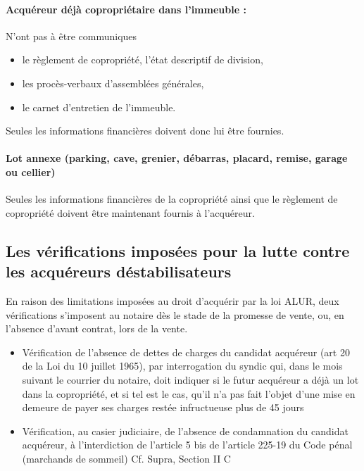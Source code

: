 			\paragraph{Acquéreur déjà copropriétaire dans l'immeuble :}
			N’ont pas à être communiques
			\begin{itemize}
				\item  le règlement de copropriété, l'état descriptif de division,
				\item  les procès-verbaux d'assemblées générales,
				\item  le carnet d'entretien de l'immeuble.
			\end{itemize}
			Seules les informations financières doivent donc lui être fournies.
			
			\paragraph{Lot annexe (parking, cave, grenier, débarras, placard, remise, garage ou cellier)}
			Seules les informations financières de la copropriété ainsi que le règlement de copropriété doivent être
			maintenant fournis à l'acquéreur.
		
	\subsection{Les vérifications imposées pour la lutte contre les acquéreurs déstabilisateurs}
		
		En raison des limitations imposées au droit d’acquérir par la loi ALUR, deux vérifications s’imposent au
		notaire dès le stade de la promesse de vente, ou, en l’absence d’avant contrat, lors de la vente.
		\begin{itemize}
			\item Vérification de l’absence de dettes de charges du candidat acquéreur (art 20 \II{} de la Loi du 10
			juillet 1965), par interrogation du syndic qui, dans le mois suivant le courrier du notaire, doit
			indiquer si le futur acquéreur a déjà un lot dans la copropriété, et si tel est le cas, qu’il n’a pas fait
			l’objet d’une mise en demeure de payer ses charges restée infructueuse plus de 45 jours
			
			\item Vérification, au casier judiciaire, de l’absence de condamnation du candidat acquéreur, à
			l’interdiction de l’article 5\degre{} bis de l’article 225-19 du Code pénal (marchands de sommeil)
			Cf. Supra, Section II C
		\end{itemize}
		
